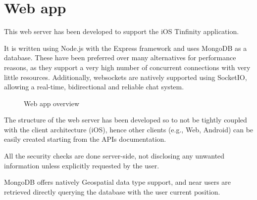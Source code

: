  
\section{Web app}
This web server has been developed to support the iOS Tinfinity application. 

It is written using Node.js with the Express framework and uses MongoDB as a database. These have been preferred over many alternatives for performance reasons, as they support a very high number of concurrent connections with very little resources. Additionally, websockets are natively supported using SocketIO, allowing a real-time, bidirectional and reliable chat system.

\begin{figure}[H]
\caption{Web app overview}
\end{figure}

The structure of the web server has been developed so to not be tightly coupled with the client architecture (iOS), hence other clients (e.g., Web, Android) can be easily created starting from the APIs documentation.

All the security checks are done server-side, not disclosing any unwanted information unless explicitly requested by the user.

MongoDB offers natively Geospatial data type support, and near users are retrieved directly querying the database with the user current position.